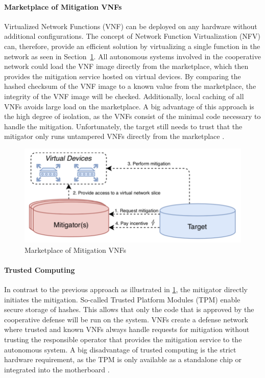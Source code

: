 \paragraph{Marketplace of Mitigation VNFs}
Virtualized  Network Functions (VNF) can be deployed on any hardware without additional configurations. The concept of Network Function Virtualization (NFV) can, therefore, provide an efficient solution by virtualizing a single function in the network as seen in Section~\ref{ddos_marketplace_vnf}. All autonomous systems involved in the cooperative network could load the VNF image directly from the marketplace, which then provides the mitigation service hosted on virtual devices. By comparing the hashed checksum of the VNF image to a known value from the marketplace, the integrity of the VNF image will be checked. Additionally, local caching of all VNFs avoids large load on the marketplace. A big advantage of this approach is the high degree of isolation, as the VNFs consist of the minimal code necessary to handle the mitigation. Unfortunately, the target still needs to trust that the mitigator only runs untampered VNFs directly from the marketplace \cite{Mannhart2018}.
\begin{figure}[ht]
  \begin{center}
    \includegraphics[scale=0.5]{Talk7/img/ddos/cooperative_network_marketplace_vnfs}
  \end{center}
  \caption{Marketplace of Mitigation VNFs}
  \label{ddos_marketplace_vnf}
\end{figure}

\paragraph{Trusted Computing}
In contrast to the previous approach as illustrated in \ref{ddos_marketplace_vnf}, the mitigator directly initiates the mitigation. So-called Trusted Platform Modules (TPM) enable secure storage of hashes. This allows that only the code that is approved by the cooperative defense will be run on the system. VNFs create a defense network where trusted and known VNFs always handle requests for mitigation without trusting the responsible operator that provides the mitigation service to the autonomous system.  A big disadvantage of trusted computing is the strict hardware requirement, as the TPM is only available as a standalone chip or integrated into the motherboard \cite{Mannhart2018}.

